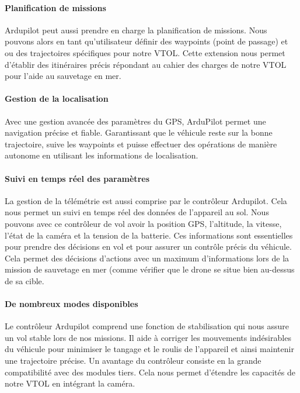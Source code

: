 \documentclass[a4paper,12pt,french]{report}
\begin{document}
\paragraph{Planification de missions} Ardupilot peut aussi prendre en charge la planification de missions. Nous pouvons alors en tant qu’utilisateur définir des waypoints (point de passage) et ou des trajectoires spécifiques pour notre VTOL. Cette extension nous permet d’établir des itinéraires précis répondant au cahier des charges de notre VTOL pour l’aide au sauvetage en mer.

\paragraph{Gestion de la localisation} Avec une gestion avancée des paramètres du GPS, ArduPilot permet une navigation précise et fiable. Garantissant que le véhicule reste sur la bonne trajectoire, suive les waypoints et puisse effectuer des opérations de manière autonome en utilisant les informations de localisation.

\paragraph{Suivi en temps réel des paramètres} La gestion de la télémétrie est aussi comprise par le contrôleur Ardupilot. Cela nous permet un suivi en temps réel des données de l’appareil au sol. Nous pouvons avec ce contrôleur de vol avoir la position GPS, l'altitude, la vitesse, l’état de la caméra et la tension de la batterie. Ces informations sont essentielles pour prendre des décisions en vol et pour assurer un contrôle précis du véhicule. Cela permet des décisions d’actions avec un maximum d’informations lors de la mission de sauvetage en mer (comme vérifier que le drone se situe bien au-dessus de sa cible.

\paragraph{De nombreux modes disponibles} Le contrôleur Ardupilot comprend une fonction de stabilisation qui nous assure un vol stable lors de nos missions. Il aide à corriger les mouvements indésirables du véhicule pour minimiser le tangage et le roulis de l’appareil et ainsi maintenir une trajectoire précise.
Un avantage du contrôleur consiste en la grande compatibilité avec des modules tiers. Cela nous permet d’étendre les capacités de notre VTOL en intégrant la caméra.
\end{document}
